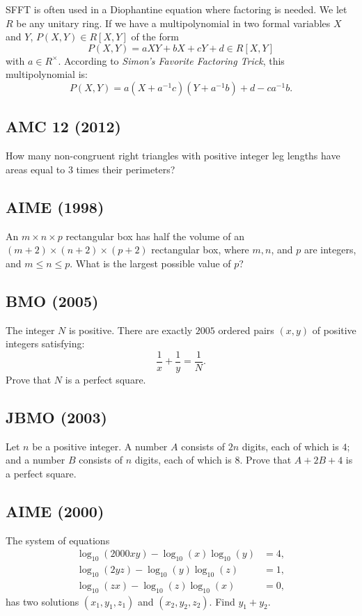 \begin{problem}
    SFFT is often used in a Diophantine equation where factoring is needed. We let \( R \) be any unitary ring. If we have a multipolynomial in two formal variables \( X \) and \( Y \), \( P\left(X,Y\right) \in R\left[X,Y\right] \) of the form
    \[
        P\left(X,Y\right) = aXY + bX + cY + d \in R\left[X,Y\right]
    \]
    with \( a \in R^{\times} \). According to \textit{Simon's Favorite Factoring Trick}, this multipolynomial is:
    \[
        P\left(X,Y\right) = a\left(X + a^{-1}c\right)\left(Y + a^{-1}b\right) + d - ca^{-1}b.
    \]

    \subsection{AMC 12 (2012)} How many non-congruent right triangles with positive integer leg lengths have areas equal to \( 3 \) times their perimeters?

    \subsection{AIME (1998)} An \( m \times n \times p \) rectangular box has half the volume of an \( \left(m+2\right) \times \left(n+2\right) \times \left(p+2\right) \) rectangular box, where \( m, n \), and \( p \) are integers, and \( m \leq n \leq p \). What is the largest possible value of \( p \)?

    \subsection{BMO (2005)} The integer \( N \) is positive. There are exactly \( 2005 \) ordered pairs \( \left(x,y\right) \) of positive integers satisfying:
    \[
        \frac{1}{x} + \frac{1}{y} = \frac{1}{N}.
    \]
    Prove that \( N \) is a perfect square.

    \subsection{JBMO (2003)} Let \( n \) be a positive integer. A number \( A \) consists of \( 2n \) digits, each of which is \( 4 \); and a number \( B \) consists of \( n \) digits, each of which is \( 8 \). Prove that \( A + 2B + 4 \) is a perfect square.

    \subsection{AIME (2000)} The system of equations
    \begin{align*}
        \log_{10}(2000xy) - \log_{10}\left(x\right)\log_{10}\left(y\right) &= 4, \\
        \log_{10}(2yz) - \log_{10}\left(y\right)\log_{10}\left(z\right) &= 1, \\
        \log_{10}(zx) - \log_{10}\left(z\right)\log_{10}\left(x\right) &= 0,
    \end{align*}
    has two solutions \( \left(x_{1},y_{1},z_{1}\right) \) and \( \left(x_{2},y_{2},z_{2}\right) \). Find \( y_{1} + y_{2} \).
\end{problem}
